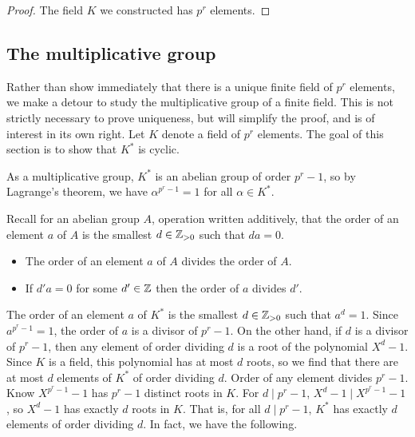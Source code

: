 \begin{proof}
The field $ K $ we constructed has $ p^r $ elements.
\end{proof}


\subsection{The multiplicative group}

Rather than show immediately that there is a unique finite field of $ p^r $ elements, we make a detour to study the multiplicative group of a finite field. This is not strictly necessary to prove uniqueness, but will simplify the proof, and is of interest in its own right. Let $ K $ denote a field of $ p^r $ elements. The goal of this section is to show that $ K^* $ is cyclic.

\begin{note*}
As a multiplicative group, $ K^* $ is an abelian group of order $ p^r - 1 $, so by Lagrange's theorem, we have $ \alpha^{p^r - 1} = 1 $ for all $ \alpha \in K^* $.
\end{note*}

Recall for an abelian group $ A $, operation written additively, that the order of an element $ a $ of $ A $ is the smallest $ d \in \mathbb{Z}_{> 0} $ such that $ da = 0 $.
\begin{itemize}
\item The order of an element $ a $ of $ A $ divides the order of $ A $.
\item If $ d'a = 0 $ for some $ d' \in \mathbb{Z} $ then the order of $ a $ divides $ d' $.
\end{itemize}
The order of an element $ a $ of $ K^* $ is the smallest $ d \in \mathbb{Z}_{> 0} $ such that $ a^d = 1 $. Since $ a^{p^r - 1} = 1 $, the order of $ a $ is a divisor of $ p^r - 1 $. On the other hand, if $ d $ is a divisor of $ p^r - 1 $, then any element of order dividing $ d $ is a root of the polynomial $ X^d - 1 $. Since $ K $ is a field, this polynomial has at most $ d $ roots, so we find that there are at most $ d $ elements of $ K^* $ of order dividing $ d $. Order of any element divides $ p^r - 1 $. Know $ X^{p^r - 1} - 1 $ has $ p^r - 1 $ distinct roots in $ K $. For $ d \mid p^r - 1 $, $ X^d - 1 \mid X^{p^r - 1} - 1 $, so $ X^d - 1 $ has exactly $ d $ roots in $ K $. That is, for all $ d \mid p^r - 1 $, $ K^* $ has exactly $ d $ elements of order dividing $ d $. In fact, we have the following.

